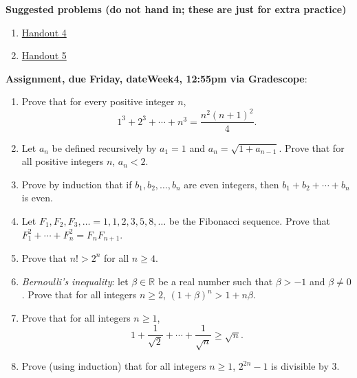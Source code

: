 \documentclass[12pt]{article}
\newcommand{\HWdueTime}{12:55pm }
\begin{document}
\noindent \textbf{Suggested problems (do not hand in; these are just for extra practice)}

\begin{enumerate}
\item \href{https://www.math.emory.edu/~dzb/teaching/250Spring2021/handouts/250-H04-induction-warmup.pdf}{Handout 4}
\item \href{https://www.math.emory.edu/~dzb/teaching/250Spring2021/handouts/250-H05-induction-problems.pdf}{Handout 5}
\end{enumerate}

\noindent \textbf{Assignment, due Friday, \csname dateWeek4\endcsname, \HWdueTime via Gradescope}:
\begin{enumerate}
\item Prove that for every positive integer $n$,
 $$1^3 + 2^3 + \cdots +n^3 = \frac{n^2(n+1)^2}{4}.$$ 
\item Let $a_n$ be defined recursively by $a_1 = 1$ and $a_n = \sqrt{1 + a_{n-1}}$. Prove that for all positive integers $n$, $a_n < 2$.
\item Prove by induction that if $b_1, b_2, \ldots , b_n$ are even integers, then $b_1 + b_2 + \cdots + b_n$ is even.
 \item Let $F_1, F_2, F_3, \ldots = 1,1,2,3,5,8,\ldots$ be the Fibonacci sequence. Prove that $F_1^2 + \cdots + F_n^2 = F_nF_{n+1}$.
 \item Prove that $n! > 2^n$ for all $n \geq 4$.
 \item \emph{Bernoulli's inequality}: let $\beta \in \mathbb{R}$ be a real number such that $\beta > -1$ and $\beta \neq 0$. Prove that for all integers $n \geq 2$, $(1 + \beta)^n > 1 + n\beta$.
 \item Prove that for all integers $n \geq 1$,
   \[
1 + \frac{1}{\sqrt{2}} + \cdots + \frac{1}{\sqrt{n}} \geq \sqrt{n}.
     \]
   \item Prove (using induction) that for all integers $n \geq 1$, $2^{2n}-1$ is divisible by 3.
 \end{enumerate}


 
\newpage
\end{document}
